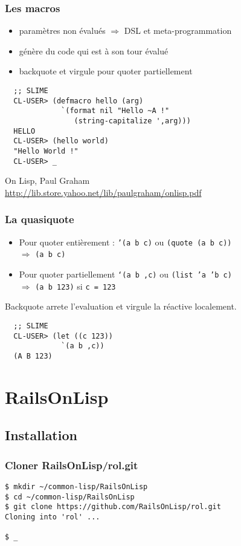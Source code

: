 \documentclass[8pt]{beamer}
\begin{document}
\begin{frame}[fragile]
  \frametitle{Les macros}
  \begin{itemize}
    \item paramètres non évalués $\Rightarrow$ DSL et meta-programmation
    \item génère du code qui est à son tour évalué
    \item backquote et virgule pour quoter partiellement
  \end{itemize}
\begin{verbatim}
  ;; SLIME
  CL-USER> (defmacro hello (arg)
             `(format nil "Hello ~A !"
                (string-capitalize ',arg)))
  HELLO
  CL-USER> (hello world)
  "Hello World !"
  CL-USER> _
\end{verbatim}
  \vspace{1em}
  On Lisp, Paul Graham \\
  \url{http://lib.store.yahoo.net/lib/paulgraham/onlisp.pdf}
\end{frame}

\begin{frame}[fragile]
  \frametitle{La quasiquote}
  \begin{itemize}
  \item Pour quoter entièrement : {\tt '(a b c)} ou {\tt (quote (a b c))} \\
    $\Rightarrow$ {\tt (a b c)}
  \item Pour quoter partiellement {\tt `(a b ,c)} ou {\tt (list 'a 'b c)} \\
    $\Rightarrow$ {\tt (a b 123)} si {\tt c = 123}
  \end{itemize}
  Backquote arrete l'evaluation et virgule la réactive localement.
\begin{verbatim}
  ;; SLIME
  CL-USER> (let ((c 123))
             `(a b ,c))
  (A B 123)
\end{verbatim}
\end{frame}

\section{RailsOnLisp}
\subsection{Installation}

\begin{frame}[fragile]
  \frametitle{Cloner RailsOnLisp/rol.git}
\begin{verbatim}
$ mkdir ~/common-lisp/RailsOnLisp
$ cd ~/common-lisp/RailsOnLisp
$ git clone https://github.com/RailsOnLisp/rol.git
Cloning into 'rol' ...

$ _
\end{verbatim}
\end{frame}
\end{document}
